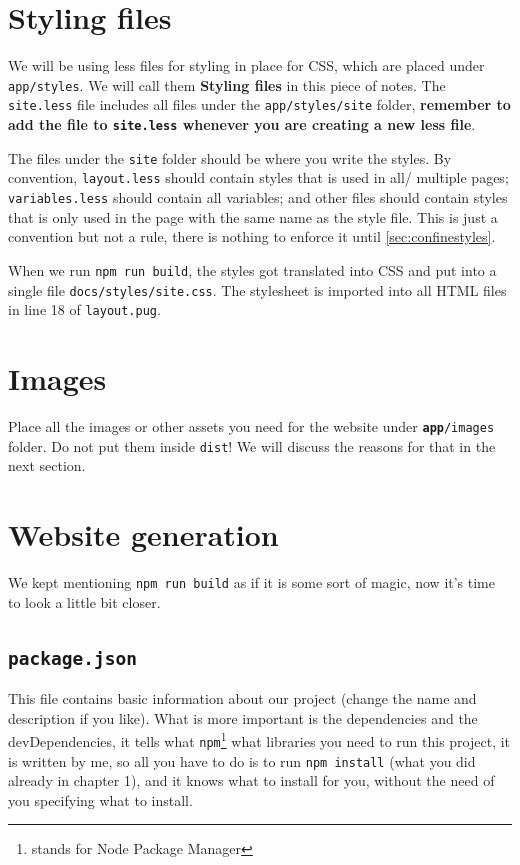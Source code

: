 \section{Styling files}

We will be using less files for styling in place for CSS, which are placed under \texttt{app/styles}. We will call them \textbf{Styling files} in this piece of notes. The \texttt{site.less} file includes all files under the \texttt{app/styles/site} folder, \textbf{remember to add the file to \texttt{site.less} whenever you are creating a new less file}. 

The files under the \texttt{site} folder should be where you write the styles. By convention, \texttt{layout.less} should contain styles that is used in all/ multiple pages; \texttt{variables.less} should contain all variables; and other files should contain styles that is only used in the page with the same name as the style file. This is just a convention but not a rule, there is nothing to enforce it until \cref{sec:confinestyles}.

When we run \texttt{npm run build}, the styles got translated into CSS and put into a single file \texttt{docs/styles/site.css}. The stylesheet is imported into all HTML files in line 18 of \texttt{layout.pug}.

\section{Images}

Place all the images or other assets you need for the website under \texttt{\textbf{app}/images} folder. Do not put them inside \texttt{dist}! We will discuss the reasons for that in the next section. 

\section{Website generation}
\label{sec:webgen}
We kept mentioning \texttt{npm run build} as if it is some sort of magic, now it's time to look a little bit closer.

\subsection{\texttt{package.json}}

This file contains basic information about our project (change the name and description if you like). What is more important is the dependencies and the devDependencies, it tells what \texttt{npm}\footnote{stands for Node Package Manager} what libraries you need to run this project, it is written by me, so all you have to do is to run \texttt{npm install} (what you did already in chapter 1), and it knows what to install for you, without the need of you specifying what to install.


